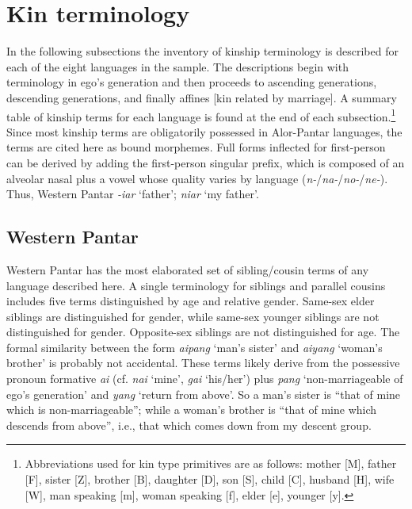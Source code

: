 \section{Kin terminology}
In the following subsections the inventory of kinship terminology is described for each of the eight languages in the sample. The descriptions begin with terminology in ego's generation and then proceeds to ascending generations, descending generations, and finally affines [kin related by marriage]. A summary table of kinship terms for each language is found at the end of each subsection.\footnote{{ }  Abbreviations used for kin type primitives are as follows: mother [M], father [F], sister [Z], brother [B], daughter [D], son [S], child [C], husband [H], wife [W], man speaking [m], woman speaking [f], elder [e], younger [y].}   Since most kinship terms are obligatorily possessed in Alor-Pantar languages, the terms are cited here as bound morphemes. Full forms inflected for first-person can be derived by adding the first-person singular prefix, which is composed of an alveolar nasal plus a vowel whose quality varies by language (\textit{n-}/\textit{na-}/\textit{no-}/\textit{ne-}). Thus, Western Pantar \textit{-iar} `father'; \textit{niar} `my father'.

\subsection{Western Pantar}\label{sect_wp}
Western Pantar has the most elaborated set of sibling/cousin terms of any language described here. A single terminology for siblings and parallel cousins includes five terms distinguished by age and relative gender. Same-sex elder siblings are distinguished for gender, while same-sex younger siblings are not distinguished for gender. Opposite-sex siblings are not distinguished for age. The formal similarity between the form \textit{aipang} `man's sister' and \textit{aiyang} `woman's brother' is probably not accidental. These terms likely derive from the possessive pronoun formative \textit{ai} (cf. \textit{nai} `mine', \textit{gai} `his/her') plus \textit{pang} `non-marriageable of ego's generation' and \textit{yang} `return from above'. So a man's sister is ``that of mine which is non-marriageable''; while a woman's brother is ``that of mine which descends from above'', i.e., that which comes down from my descent group. 

